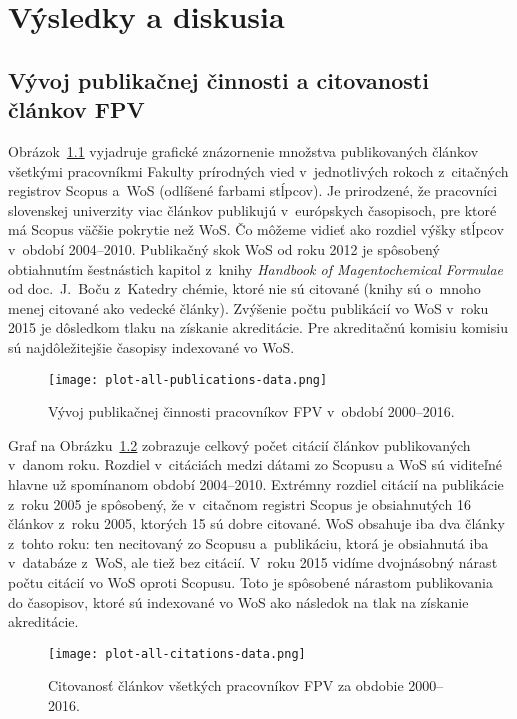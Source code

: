 \chapter{Výsledky a diskusia}
\label{chap:results}

\section{Vývoj publikačnej činnosti a citovanosti článkov FPV}

Obrázok~\ref{fig:all.publications.plot} vyjadruje grafické znázornenie množstva
publikovaných článkov všetkými pracovníkmi Fakulty prírodných vied
v~jednotlivých rokoch z~citačných registrov Scopus a~WoS (odlíšené farbami
stĺpcov).  Je prirodzené, že pracovníci slovenskej univerzity viac článkov
publikujú v~európskych časopisoch, pre ktoré má Scopus väčšie pokrytie než WoS.
Čo môžeme vidieť ako rozdiel výšky stĺpcov v~období 2004--2010.  Publikačný skok
WoS od roku 2012 je spôsobený obtiahnutím šestnástich kapitol z~knihy
\emph{Handbook of Magentochemical Formulae} od doc.~J.~Boču z~Katedry chémie,
ktoré nie sú citované (knihy sú o~mnoho menej citované ako vedecké články).
Zvýšenie počtu publikácií vo WoS v~roku 2015 je dôsledkom tlaku na získanie
akreditácie.  Pre akreditačnú komisiu komisiu sú najdôležitejšie časopisy
indexované vo WoS.

\begin{figure}
  \centering
  \texttt{[image: plot-all-publications-data.png]}
  \caption[Vývoj publikačnej činnosti pracovníkov FPV v~období 2000--2016]%
  {Vývoj publikačnej činnosti pracovníkov FPV v~období 2000--2016.}
  \label{fig:all.publications.plot}
\end{figure}

Graf na Obrázku~\ref{fig:all.citations.plot} zobrazuje celkový počet citácií
článkov publikovaných v~danom roku.  Rozdiel v~citáciách medzi dátami zo Scopusu
a WoS sú viditeľné hlavne už spomínanom období 2004--2010.  Extrémny rozdiel
citácií na publikácie z~roku 2005 je spôsobený, že v~citačnom registri Scopus je
obsiahnutých 16 článkov z~roku 2005, ktorých 15 sú dobre citované.  WoS obsahuje
iba dva články z~tohto roku: ten necitovaný zo Scopusu a~publikáciu, ktorá je
obsiahnutá iba v~databáze z~WoS, ale tiež bez citácií.  V~roku 2015 vidíme
dvojnásobný nárast počtu citácií vo WoS oproti Scopusu.  Toto je spôsobené
nárastom publikovania do časopisov, ktoré sú indexované vo WoS ako následok na
tlak na získanie akreditácie.

\begin{figure}
  \centering
  \texttt{[image: plot-all-citations-data.png]}
  \caption[Citovanosť článkov všetkých pracovníkov FPV za obdobie 2000--2016]%
  {Citovanosť článkov všetkých pracovníkov FPV za obdobie 2000--2016.}
  \label{fig:all.citations.plot}
\end{figure}


